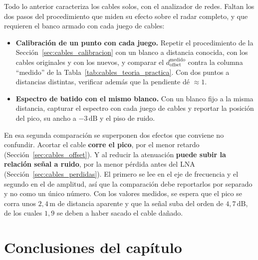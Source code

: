 \documentclass[12pt, a4paper, twoside]{report}
\begin{document}
Todo lo anterior caracteriza los cables solos, con el analizador de
redes. Faltan los dos pasos del procedimiento que miden su efecto sobre
el radar completo, y que requieren el banco armado con cada juego de
cables:

\begin{itemize}
  \item \textbf{Calibración de un punto con cada juego.} Repetir el
    procedimiento de la Sección~\ref{sec:cables_calibracion} con un
    blanco a distancia conocida, con los cables originales y con los
    nuevos, y comparar el $d_\text{offset}^\text{medido}$ contra la
    columna ``medido'' de la Tabla~\ref{tab:cables_teoria_practica}.
    Con dos puntos a distancias distintas, verificar además que la
    pendiente dé $\approx 1$.
  \item \textbf{Espectro de batido con el mismo blanco.} Con un blanco
    fijo a la misma distancia, capturar el espectro con cada juego de
    cables y reportar la posición del pico, su ancho a
    $-3\,\text{dB}$ y el piso de ruido.
\end{itemize}

En esa segunda comparación se superponen dos efectos que conviene no
confundir. Acortar el cable \textbf{corre el pico}, por el menor
retardo (Sección~\ref{sec:cables_offset}). Y al reducir la atenuación
\textbf{puede subir la relación señal a ruido}, por la menor pérdida
antes del LNA (Sección~\ref{sec:cables_perdidas}). El primero se lee en
el eje de frecuencia y el segundo en el de amplitud, así que la
comparación debe reportarlos por separado y no como un único número.
Con los valores medidos, se espera que el pico se corra unos
$2{,}4\,\text{m}$ de distancia aparente y que la señal suba del orden de
$4{,}7\,\text{dB}$, de los cuales $1{,}9$ se deben a haber sacado el
cable dañado.


\section{Conclusiones del capítulo}
\label{sec:cables_conclusiones}
\end{document}
